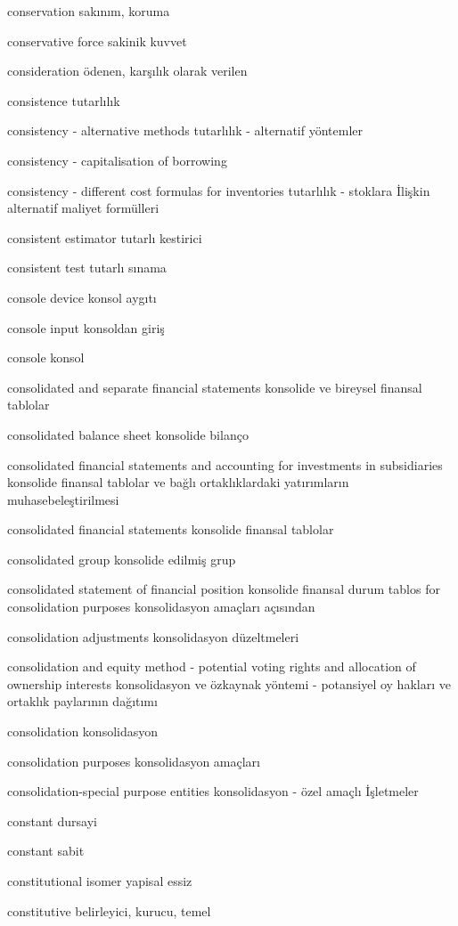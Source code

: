 \documentclass[12pt,fleqn]{article}\usepackage{../../common}
\begin{document}
conservation sakınım, koruma

conservative force sakinik kuvvet

consideration ödenen, karşılık olarak verilen

consistence tutarlılık

consistency - alternative methods tutarlılık - alternatif yöntemler

consistency - capitalisation of borrowing

consistency - different cost formulas for inventories tutarlılık - stoklara İlişkin alternatif maliyet formülleri

consistent estimator tutarlı kestirici

consistent test tutarlı sınama

console device konsol aygıtı

console input konsoldan giriş

console konsol

consolidated and separate financial statements konsolide ve bireysel finansal tablolar

consolidated balance sheet konsolide bilanço

consolidated financial statements and accounting for investments in subsidiaries konsolide finansal tablolar ve bağlı ortaklıklardaki yatırımların muhasebeleştirilmesi

consolidated financial statements konsolide finansal tablolar

consolidated group konsolide edilmiş grup

consolidated statement of financial position konsolide finansal durum tablos for consolidation purposes konsolidasyon amaçları açısından

consolidation adjustments konsolidasyon düzeltmeleri

consolidation and equity method - potential voting rights and allocation of ownership interests konsolidasyon ve özkaynak yöntemi - potansiyel oy hakları ve ortaklık paylarının dağıtımı

consolidation konsolidasyon

consolidation purposes konsolidasyon amaçları

consolidation-special purpose entities konsolidasyon - özel amaçlı İşletmeler

constant dursayi

constant sabit

constitutional isomer yapisal essiz

constitutive belirleyici, kurucu, temel
\end{document}
